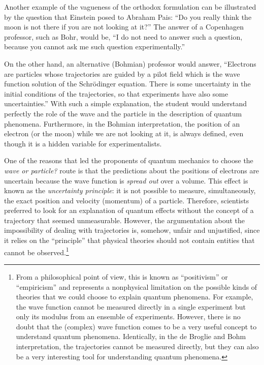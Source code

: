 \documentclass[onecolumn,nofootinbib, secnumarabic, amsmath, nobibnotes,12pt,aps,pra]{revtex4-1}
\begin{document}
Another example of the vagueness of the orthodox formulation can be illustrated by the question that Einstein posed to Abraham Pais: ``Do you really think the moon is not there if you are not looking at it?'' The answer of a Copenhagen professor, such as Bohr, would be, ``I do not need to answer such a question, because you cannot ask me such question experimentally.''

On the other hand, an alternative (Bohmian) professor would answer,
``Electrons are particles whose trajectories are guided by a pilot
field which is  the wave function solution of the Schr\"odinger
equation. There is some uncertainty in the initial conditions of the
trajectories, so that experiments have also some uncertainties.''
With such a simple explanation, the student would understand
perfectly the role of the wave and the particle in the description
of quantum phenomena. Furthermore, in the Bohmian interpretation,
the position of an electron (or the moon) while we are not looking
at it, is always defined, even though it is a hidden variable  for experimentalists.

One of the reasons that led the proponents of quantum mechanics to
choose the \textit{wave or particle?} route is that the predictions
about the positions of electrons are uncertain because the wave
function is \textit{spread out} over a volume. This effect is known
as the \textit{uncertainty principle}: it is not possible to
measure, simultaneously, the exact position and velocity (momentum)
of a particle. Therefore, scientists preferred to look for an
explanation of quantum effects without the concept of a trajectory
that seemed unmeasurable. However, the argumentation about the
impossibility of dealing with trajectories is, somehow, unfair and
unjustified, since it relies on the ``principle'' that physical
theories should not contain entities that cannot be
observed.\footnote{From a philosophical point of view, this is known
as ``positivism'' or ``empiricism'' and represents a nonphysical
limitation on the possible kinds of theories that we could choose to
explain quantum phenomena. For example, the wave function cannot be
measured directly in a single experiment but only its modulus from
an ensemble of experiments. However, there is no doubt that the
(complex) wave function comes to be a very useful
concept to understand quantum phenomena. Identically, in the de
Broglie and Bohm interpretation, the trajectories cannot be measured
directly, but they can also be a very interesting tool for
understanding quantum phenomena.}
\end{document}
